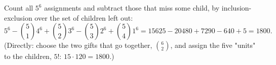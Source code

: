 Count all $5^6$ assignments and subtract those that miss some child, by inclusion-exclusion over the set of children left out:
\[5^6-\binom51 4^6+\binom52 3^6-\binom53 2^6+\binom54 1^6=15625-20480+7290-640+5=\boxed{1800}.\]
(Directly: choose the two gifts that go together, $\binom62$, and assign the five "units" to the children, $5!$: $15\cdot120=1800$.)
